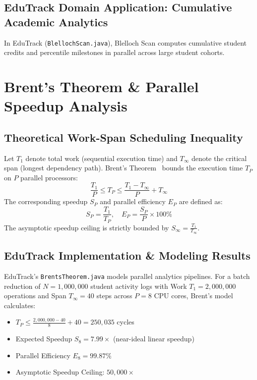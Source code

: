 \subsection{EduTrack Domain Application: Cumulative Academic Analytics}
In EduTrack (\texttt{BlellochScan.java}), Blelloch Scan computes cumulative student credits and percentile milestones in parallel across large student cohorts.

\section{Brent's Theorem \& Parallel Speedup Analysis}
\subsection{Theoretical Work-Span Scheduling Inequality}
Let $T_1$ denote total work (sequential execution time) and $T_\infty$ denote the critical span (longest dependency path). Brent's Theorem~\cite{brent1974} bounds the execution time $T_P$ on $P$ parallel processors:
\begin{equation}
\frac{T_1}{P} \le T_P \le \frac{T_1 - T_\infty}{P} + T_\infty
\end{equation}
The corresponding speedup $S_P$ and parallel efficiency $E_P$ are defined as:
\begin{equation}
S_P = \frac{T_1}{T_P}, \quad E_P = \frac{S_P}{P} \times 100\%
\end{equation}
The asymptotic speedup ceiling is strictly bounded by $S_\infty = \frac{T_1}{T_\infty}$.

\subsection{EduTrack Implementation \& Modeling Results}
EduTrack's \texttt{BrentsTheorem.java} models parallel analytics pipelines. For a batch reduction of $N = 1{,}000{,}000$ student activity logs with Work $T_1 = 2{,}000{,}000$ operations and Span $T_\infty = 40$ steps across $P = 8$ CPU cores, Brent's model calculates:
\begin{itemize}
    \item $T_P \le \frac{2{,}000{,}000 - 40}{8} + 40 = 250{,}035$ cycles
    \item Expected Speedup $S_8 = 7.99\times$ (near-ideal linear speedup)
    \item Parallel Efficiency $E_8 = 99.87\%$
    \item Asymptotic Speedup Ceiling: $50{,}000\times$
\end{itemize}

